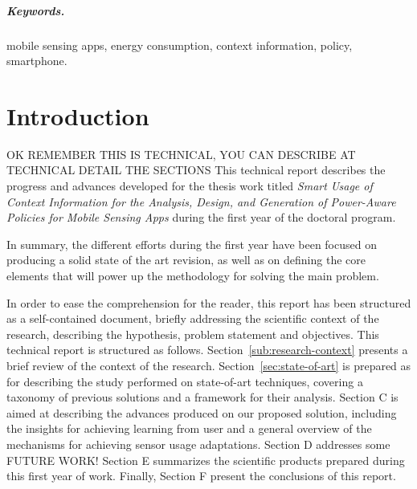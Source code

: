 \documentclass[12pt]{article}
\numberwithin{equation}{section}
\numberwithin{table}{section}
\numberwithin{figure}{section}
\begin{document}

\subparagraph{Keywords.} mobile sensing apps, energy consumption, context information, policy, smartphone.

\section{Introduction}
\label{sec:introduction}
OK REMEMBER THIS IS TECHNICAL, YOU CAN DESCRIBE AT TECHNICAL DETAIL THE SECTIONS
This technical report describes the progress and advances developed for the thesis work titled \emph{Smart Usage of Context Information for the Analysis, Design, and Generation of Power-Aware Policies for Mobile Sensing Apps} during the first year of the doctoral program.

In summary, the different efforts during the first year have been focused on producing a solid state of the art revision, as well as on defining the core elements that will power up the methodology for solving the main problem.


In order to ease the comprehension for the reader, this report has been structured as a self-contained document, briefly addressing the scientific context of the research, describing the hypothesis, problem statement and objectives.
This technical report is structured as follows.
Section~\ref{sub:research-context} presents a brief review of the context of the research.
Section~\ref{sec:state-of-art} is prepared as for describing the study performed on state-of-art techniques, covering a taxonomy of previous solutions and a framework for their analysis.
Section C is aimed at describing the advances produced on our proposed solution, including the insights for achieving learning from user and a general overview of the mechanisms for achieving sensor usage adaptations.
Section D addresses some FUTURE WORK!
Section E summarizes the scientific products prepared during this first year of work.
Finally, Section F present the conclusions of this report.
\end{document}
